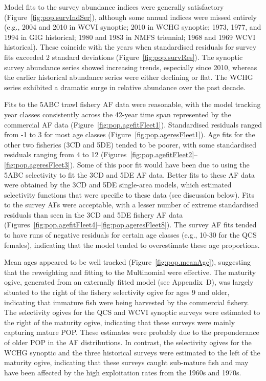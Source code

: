 \documentclass[11pt]{book}
\newcommand{\AppBio}{Appendix~D}
\begin{document}
Model fits to the survey abundance indices were generally satisfactory (Figure~\ref{fig:pop.survIndSer}), although some annual indices were missed entirely (e.g., 2004 and 2010 in WCVI synoptic; 2010 in WCHG synoptic; 1973, 1977, and 1994 in GIG historical; 1980 and 1983 in NMFS triennial; 1968 and 1969 WCVI historical).
These coincide with the years when standardised residuals for survey fits exceeded 2 standard deviations (Figure~\ref{fig:pop.survRes}).
The synoptic survey abundance series showed increasing trends, especially since 2010, whereas the earlier historical abundance series were either declining or flat.
The WCHG series exhibited a dramatic surge in relative abundance over the past decade.

Fits to the 5ABC trawl fishery AF data were reasonable, with the model tracking year classes consistently across the 42-year time span represented by the commercial AF data (Figure~\ref{fig:pop.agefitFleet1}).
Standardised residuals ranged from -1 to 3 for most age classes (Figure~\ref{fig:pop.ageresFleet1}).
Age fits for the other two fisheries (3CD and 5DE) tended to be poorer, with some standardised residuals ranging from 4 to 12 (Figures~\ref{fig:pop.agefitFleet2}--\ref{fig:pop.ageresFleet3}).
Some of this poor fit would have been due to using the 5ABC selectivity to fit the 3CD and 5DE AF data. 
Better fits to these AF data were obtained by the 3CD and 5DE single-area models, which estimated selectivity functions that were specific to these data (see discussion below).
Fits to the survey AFs were acceptable, with a lesser number of extreme standardised residuals than seen in the 3CD and 5DE fishery AF data (Figures~\ref{fig:pop.agefitFleet4}--\ref{fig:pop.ageresFleet8}).
The survey AF fits tended to have runs of negative residuals for certain age classes (e.g., 10-30 for the QCS females), indicating that the model tended to overestimate these age proportions.

Mean ages appeared to be well tracked (Figure~\ref{fig:pop.meanAge}), suggesting that the \citet{Francis:2011} reweighting and fitting to the Multinomial were effective.
The maturity ogive, generated from an externally fitted model (see \AppBio), was largely situated to the right of the fishery selectivity ogive for ages 9 and older, indicating that immature fish were being harvested by the commercial fishery.
The selectivity ogives for the QCS and WCVI synoptic surveys were estimated to the right of the maturity ogive, indicating that these surveys were mainly capturing mature POP.
These estimates were probably due to the preponderance of older POP in the AF distributions.
In contrast, the selectivity ogives for the WCHG synoptic and the three historical surveys were estimated to the left of the maturity ogive, indicating that these surveys caught sub-mature fish and may have been affected by the high exploitation rates from the 1960s and 1970s.
\end{document}
